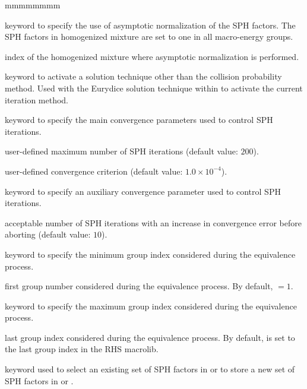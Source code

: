 \begin{ListeDeDescription}{mmmmmmmm}
\item[\moc{ASYM}] keyword to specify the use of asymptotic normalization of the
SPH factors. The SPH factors in homogenized mixture  are set to one
in all macro-energy groups.

\item[\dusa{mixs}] index of the homogenized mixture where asymptotic normalization
is performed.

\item[\moc{ARM}] keyword to activate a solution technique other than the collision probability method. Used with the Eurydice
solution technique within  to activate the current iteration method.

\item[\moc{ITER}] keyword to specify the main convergence parameters used to control SPH iterations.

\item[\dusa{maxout}] user-defined maximum number of SPH iterations (default value: $200$).

\item[\dusa{epsout}] user-defined convergence criterion (default value: $1.0 \times 10^{-4}$).

\item[\moc{MAXNB}] keyword to specify an auxiliary convergence parameter used to control SPH iterations.

\item[\dusa{maxnb}] acceptable number of SPH iterations with an increase in convergence error before
aborting (default value: $10$).

\item[\moc{GRMIN}] keyword to specify the minimum group index considered
during the equivalence process.

\item[\dusa{lgrmin}] first group number considered during the
equivalence process. By default,  $=1$.

\item[\moc{GRMAX}]  keyword to specify the maximum group index considered
during the equivalence process.

\item[\dusa{lgrmax}] last group index considered during the equivalence
process. By default,  is set to the last group
index in the RHS macrolib.

\item[\moc{EQUI}] keyword used to select an existing set of SPH factors in  or to store
a new set of SPH factors in  or .


\end{ListeDeDescription}
